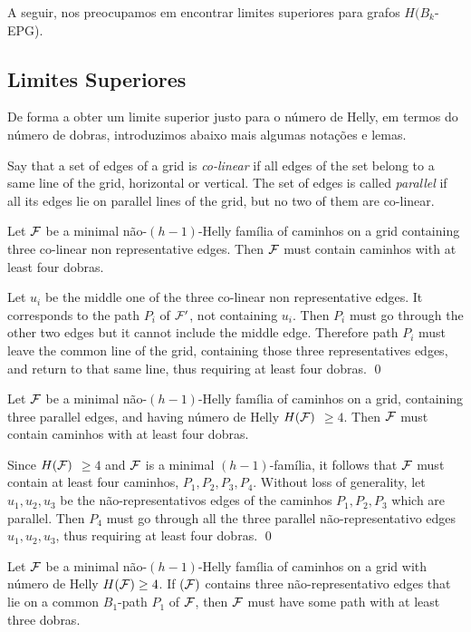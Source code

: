 A seguir, nos preocupamos em encontrar limites superiores para grafos $H(B_k$-EPG).

\subsection{Limites Superiores}\label{subsec-upper}

De forma a obter um limite superior justo para o número de Helly, em termos do número de dobras, introduzimos abaixo mais algumas notações e lemas.

Say that a set of edges of a grid is {\it co-linear} if all edges of the set belong to a same line of the grid, horizontal or vertical. The set of edges is called {\it parallel} if all its edges lie on parallel lines of the grid, but no two of them are co-linear.  


\begin{lemma}
\label{lemma:3colin}
Let $\cal {F}$ be a minimal não-$(h-1)$-Helly família of caminhos on a grid  containing  three co-linear non representative edges. Then $\cal{F}$ must contain caminhos with at least four dobras.
\end{lemma}

\proof
Let $u_i$ be the middle one of the three co-linear non representative edges. It corresponds to the  path $P_i$ of $\cal {F'}$, not containing $u_i$.
Then $P_i$ must go through  the other two edges but it cannot include the middle edge. Therefore path $P_i$ must leave the common line of the grid, containing those three representatives edges, and return to that same line, thus requiring at least four dobras.
\qed


\begin{lemma}
\label{lemma:3par}
Let $\cal{F}$ be a minimal não-$(h-1)$-Helly família of caminhos on a grid, containing three parallel edges, and having  número de Helly $H(\cal{F})$   $\geq 4$. Then $\cal{F}$ must contain caminhos with at least four dobras. 
\end{lemma}

\proof
Since $H(\cal{F}) $ $\geq 4$ and $\cal{F}$ is a minimal $(h-1)$-família, it follows that $\cal{F}$ must contain at least four caminhos, $P_1,P_2,P_3,P_4$. Without loss of generality, let $u_1,u_2,u_3$ be the não-representativos edges of the caminhos $P_1,P_2,P_3$ which are parallel. Then $P_4$ must go through all the three parallel não-representativo edges $u_1,u_2,u_3$, thus requiring at least four dobras. 
\qed


\begin{lemma} \label{lemma:Lwit}
Let $\cal{F}$ be a minimal não-$(h-1)$-Helly família of caminhos on a grid with  número de Helly $H({\cal F}) \geq 4$. If ${\cal(F)}$ contains  three não-representativo edges that  lie on a common $B_1$-path $P_1$ of $\cal{F}$, then $\cal {F}$ must have some path with at least three dobras. \end{lemma}

